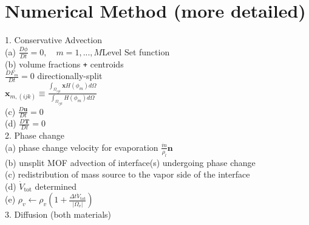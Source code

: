 \documentclass[]{article}
\begin{document}
\section*{Numerical Method (more detailed)} 
\fontsize{10pt}{8.2}\selectfont
{\color{blueaccent}1.} Conservative Advection\\
\hspace*{20pt} {\color{blueaccent}(a)} $\frac{D\phi}{Dt}=0, \quad m = 1,...,M$\quad Level Set function\\
\hspace*{20pt} {\color{blueaccent}(b)} volume fractions \texttt{+} centroids\\
\hspace*{20pt}\hspace*{20pt}\hspace*{20pt}$\frac{DF_m}{Dt}=0$ \quad directionally-split\cite{WEYMOUTH2010}\\
\hspace*{20pt}\hspace*{20pt}\hspace*{20pt}$\displaystyle \bm{x}_{m,(ijk)} \equiv \frac{\int_{\Omega_{ijk}}\bm{x}H(\phi_m)d\Omega}{\int_{\Omega_{ijk}}H(\phi_m)d\Omega}$\\
\hspace*{20pt} {\color{blueaccent}(c)} $\frac{D\bm{u}}{Dt}=0$\\
\hspace*{20pt} {\color{blueaccent}(d)} $\frac{D\bm{T}}{Dt}=0$\\
{\color{blueaccent}2.} Phase change \cite{VAHAB2021} \\
\hspace*{20pt} {\color{blueaccent}(a)} phase change velocity for evaporation $\frac{\dot{m}}{\rho_l}\bm{n}$\\
\hspace*{20pt} {\color{blueaccent}(b)} unsplit MOF advection of interface(s) undergoing phase change\\
\hspace*{20pt} {\color{blueaccent}(c)} redistribution of mass source to the vapor side of the interface\\
\hspace*{20pt} {\color{blueaccent}(d)} $\dot{V}_{\textrm{tot}}$ determined\\
\hspace*{20pt} {\color{blueaccent}(e)} $\rho_v \leftarrow \rho_v(1+\frac{\Delta t \dot{V}_{\textrm{tot}}}{|\Omega_v|})$\\
{\color{blueaccent}3.} Diffusion (both materials)\\
\end{document}
